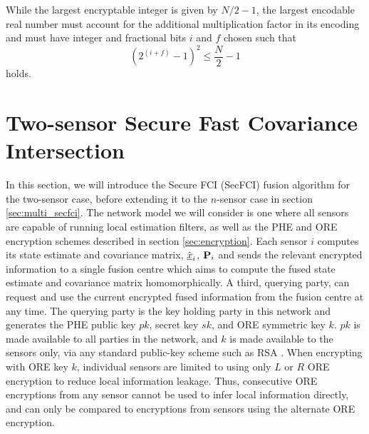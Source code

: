 \documentclass[letterpaper, 10 pt, conference]{ieeeconf}  %
\begin{document}
While the largest encryptable integer is given by $N/2-1$, the largest encodable real number must account for the additional multiplication factor in its encoding and must have integer and fractional bits $i$ and $f$ chosen such that
\begin{equation}
   (2^{(i+f)}-1)^2 \leq \frac{N}{2}-1 \label{eqn:qmn_max}
\end{equation}
holds.





\section{Two-sensor Secure Fast Covariance Intersection} \label{sec:secfci}
In this section, we will introduce the Secure FCI (SecFCI) fusion algorithm for the two-sensor case, before extending it to the $n$-sensor case in section \ref{sec:multi_secfci}. The network model we will consider is one where all sensors are capable of running local estimation filters, as well as the PHE and ORE encryption schemes described in section \ref{sec:encryption}. Each sensor $i$ computes its state estimate and covariance matrix, $\hat{{\underline{x}}}_i$, ${{\mathbf{P}}}_i$ and sends the relevant encrypted information to a single fusion centre which aims to compute the fused state estimate and covariance matrix homomorphically. A third, querying party, can request and use the current encrypted fused information from the fusion centre at any time. The querying party is the key holding party in this network and generates the PHE public key $pk$, secret key $sk$, and ORE symmetric key $k$. $pk$ is made available to all parties in the network, and $k$ is made available to the sensors only, via any standard public-key scheme such as RSA \cite{rivestMethodObtainingDigital1978}. When encrypting with ORE key $k$, individual sensors are limited to using only $L$ or $R$ ORE encryption to reduce local information leakage. Thus, consecutive ORE encryptions from any sensor cannot be used to infer local information directly, and can only be compared to encryptions from sensors using the alternate ORE encryption.
\end{document}
